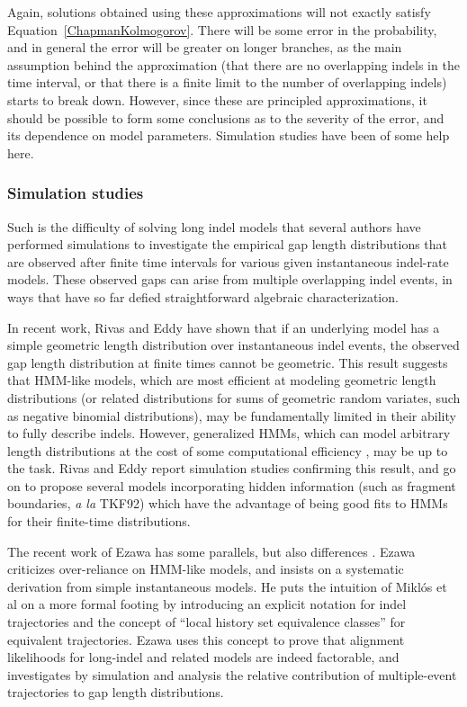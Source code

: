 \documentclass{bmcart}
\newcommand{\eqref}[1]{Equation~\ref{#1}}
\begin{document}
Again, solutions obtained using these approximations will not exactly satisfy \eqref{ChapmanKolmogorov}.
There will be some error in the probability, and in general the error will be greater
on longer branches, as the main assumption behind the approximation
(that there are no overlapping indels in the time interval, or that there is a finite
limit to the number of overlapping indels)
starts to break down.
However, since these are principled approximations, it should be possible to form some conclusions
as to the severity of the error, and its dependence on model parameters.
Simulation studies have been of some help here.

\subsubsection*{Simulation studies}

Such is the difficulty of solving long indel models that several authors have performed simulations
to investigate the empirical gap length distributions that are observed after finite time intervals
for various given instantaneous indel-rate models.
These observed gaps can arise from multiple overlapping indel events, in ways that have so far defied
straightforward algebraic characterization.

In recent work, Rivas and Eddy \cite{RivasEddy2015}
have shown that if an underlying model has a simple geometric length distribution over instantaneous indel events,
the observed gap length distribution at finite times cannot be geometric.
This result suggests that HMM-like models,
which are most efficient at modeling geometric length distributions
(or related distributions for sums of geometric random variates, such as negative binomial distributions),
may be fundamentally limited in their ability to fully describe indels.
However, generalized HMMs, which can model arbitrary length distributions at the cost of some
computational efficiency \cite{BurgeKarlin97}, may be up to the task.
Rivas and Eddy report simulation studies confirming this result,
and go on to propose several models incorporating hidden information
(such as fragment boundaries, {\em a la} TKF92)
which have the advantage of being good fits to HMMs for their finite-time distributions.

The recent work of Ezawa has some parallels, but also differences \cite{Ezawa2016a,Ezawa2016b,Ezawa2016bErratum}.
Ezawa criticizes over-reliance on HMM-like models, and insists on a systematic derivation from simple instantaneous models.
He puts the intuition of Mikl\'{o}s et al \cite{MiklosLunterHolmes2004}
on a more formal footing by introducing an explicit notation for indel trajectories
and the concept of ``local history set equivalence classes'' for equivalent trajectories.
Ezawa uses this concept to prove that alignment likelihoods for long-indel and related models are indeed factorable,
and investigates by simulation and analysis the relative contribution
of multiple-event trajectories to gap length distributions.
\end{document}
